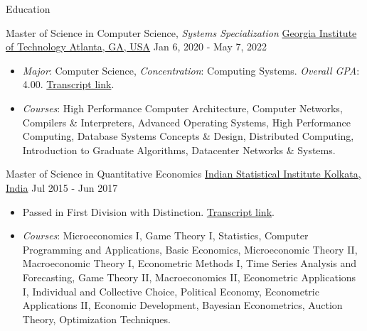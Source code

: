 \documentclass[]{mcdowellcv}
\begin{document}
  \begin{cvsection}{Education}
    \begin{cvsubsection}
      {Master of Science in Computer Science, \textit{Systems Specialization}}
      {\href{https://www.gatech.edu/}{Georgia Institute of Technology \linebreak Atlanta, GA, USA}}
      {Jan 6, 2020 - May 7, 2022}
      \begin{itemize}
        \item
          \textit{Major}: Computer Science, \textit{Concentration}: Computing
          Systems. \textit{Overall GPA}: 4.00.
          \href{https://drive.google.com/file/d/1rG1vO2I3fK_aVtkboU8p6I_6vYUQBlf9/view?usp=sharing}{Transcript
          link}.
        \item
          \textit{Courses}: High Performance Computer Architecture, Computer
          Networks, Compilers \& Interpreters, Advanced Operating Systems, High
          Performance Computing, Database Systems Concepts \& Design,
          Distributed Computing, Introduction to Graduate Algorithms,
          Datacenter Networks \& Systems.
      \end{itemize}
    \end{cvsubsection}
    \begin{cvsubsection}
      {Master of Science in Quantitative Economics}
      {\href{https://www.isical.ac.in/}{Indian Statistical Institute \linebreak Kolkata, India}}
      {Jul 2015 - Jun 2017}
      \begin{itemize}
        \item
          Passed in First Division with Distinction.
          \href{https://drive.google.com/file/d/1b0q9SZj-vi8_KwSI1X1aQ1qtAroeXgw0/view?usp=sharing}{Transcript
          link}.
        \item
          \textit{Courses}: Microeconomics I, Game Theory I, Statistics,
          Computer Programming and Applications, Basic Economics, Microeconomic
          Theory II, Macroeconomic Theory I, Econometric Methods I, Time Series
          Analysis and Forecasting, Game Theory II, Macroeconomics II,
          Econometric Applications I, Individual and Collective Choice,
          Political Economy, Econometric Applications II, Economic Development,
          Bayesian Econometrics, Auction Theory, Optimization Techniques.
      \end{itemize}
    \end{cvsubsection}
    \begin{cvsubsection}

\end{cvsubsection}
\end{cvsection}
\end{document}

